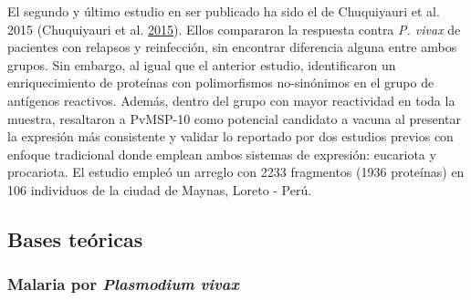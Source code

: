 \documentclass[a4paper]{article}
\begin{document}
\begin{enumerate}
  El segundo y último estudio en ser publicado ha sido el de Chuquiyauri
  et al. 2015 (Chuquiyauri et al.
  \protect\hyperlink{ref-chuquiyauri2015vivax}{2015}). Ellos compararon
  la respuesta contra \emph{P. vivax} de pacientes con relapsos y
  reinfección, sin encontrar diferencia alguna entre ambos grupos. Sin
  embargo, al igual que el anterior estudio, identificaron un
  enriquecimiento de proteínas con polimorfismos no-sinónimos en el
  grupo de antígenos reactivos. Además, dentro del grupo con mayor
  reactividad en toda la muestra, resaltaron a PvMSP-10 como potencial
  candidato a vacuna al presentar la expresión más consistente y validar
  lo reportado por dos estudios previos con enfoque tradicional donde
  emplean ambos sistemas de expresión: eucariota y procariota. El
  estudio empleó un arreglo con 2233 fragmentos (1936 proteínas) en 106
  individuos de la ciudad de Maynas, Loreto - Perú.
\end{enumerate}

\subsection{Bases teóricas}\label{bases-teoricas}

\subsubsection{\texorpdfstring{Malaria por \emph{Plasmodium
vivax}}{Malaria por Plasmodium vivax}}\label{malaria-por-plasmodium-vivax}
\end{document}
